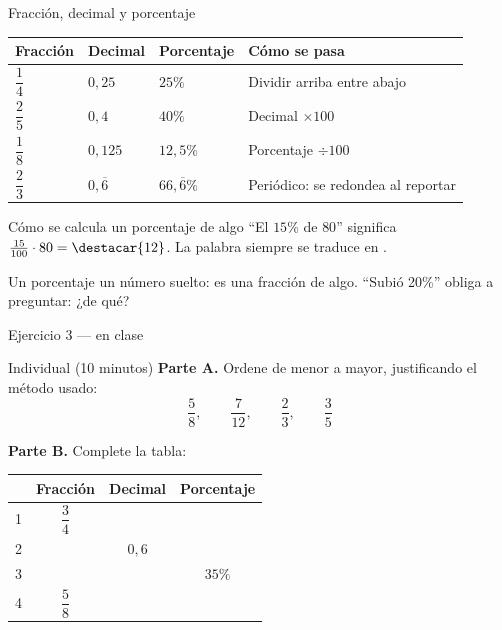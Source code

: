 \documentclass[aspectratio=169,10pt]{beamer}
\begin{document}
\begin{frame}{Fracción, decimal y porcentaje}
  \scriptsize
  \begin{center}
  \begin{tabular}{@{}p{3.2cm}p{3.2cm}p{2.4cm}p{3.0cm}@{}}
    \toprule
    \textbf{Fracción} & \textbf{Decimal} & \textbf{Porcentaje} &
    \textbf{Cómo se pasa} \\
    \midrule
    $\dfrac{1}{4}$ & $0{,}25$ & $25\%$ & Dividir arriba entre abajo \\
    \addlinespace
    $\dfrac{2}{5}$ & $0{,}4$ & $40\%$ & Decimal $\times 100$ \\
    \addlinespace
    $\dfrac{1}{8}$ & $0{,}125$ & $12{,}5\%$ & Porcentaje $\div 100$ \\
    \addlinespace
    $\dfrac{2}{3}$ & $0{,}\overline{6}$ & $66{,}\overline{6}\%$ &
      Periódico: se redondea al reportar \\
    \bottomrule
  \end{tabular}
  \end{center}

  \vspace{0.1cm}
  \begin{alertblock}{Cómo se calcula un porcentaje de algo}
    \scriptsize
    ``El $15\%$ de $80$'' significa $\tfrac{15}{100}\cdot 80 = \destacar{12}$.
    La palabra  siempre se traduce en .
  \end{alertblock}

  {\tiny\color{uniGris} Un porcentaje  un número suelto: es
  una fracción de algo. ``Subió 20\%'' obliga a preguntar: ¿de qué?}
\end{frame}

\begin{frame}{Ejercicio 3 — en clase}
  \begin{alertblock}{Individual (10 minutos)}
    \scriptsize
    \textbf{Parte A.} Ordene de menor a mayor, justificando el método usado:
    \[ \frac{5}{8}, \qquad \frac{7}{12}, \qquad \frac{2}{3},
       \qquad \frac{3}{5} \]

    \vspace{0.15cm}
    \textbf{Parte B.} Complete la tabla:

    \vspace{0.1cm}
    \centering
    \begin{tabular}{@{}lccc@{}}
      \toprule
      & \textbf{Fracción} & \textbf{Decimal} & \textbf{Porcentaje} \\
      \midrule
      1 & $\dfrac{3}{4}$ & & \\[0.5em]
      2 & & $0{,}6$ & \\[0.4em]
      3 & & & $35\%$ \\[0.3em]
      4 & $\dfrac{5}{8}$ & & \\
      \bottomrule
    \end{tabular}
  \end{alertblock}
\end{frame}
\end{document}
